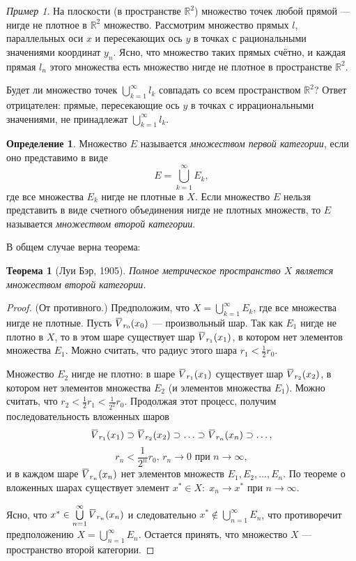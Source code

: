 \documentclass[12pt,a4paper,titlepage,oneside]{book}
\newcommand{\overbar}[1]{\mkern 1.5mu\overline{\mkern-1.5mu#1\mkern-1.5mu}\mkern 1.5mu}
\theoremstyle{definition}
\newtheorem*{definition}{Определение}
\theoremstyle{plain}
\newtheorem*{theorem}{Теорема}
\theoremstyle{break}
\theoremstyle{remark}
\theoremstyle{remark}
\newtheorem*{example}{Пример}
\theoremstyle{remark}
\theoremstyle{remark}
\theoremstyle{plain}
\theoremstyle{plain}
\begin{document}
\begin{example}
На плоскости (в пространстве $\mathbb{R}^2$) множество точек любой прямой --- нигде не плотное в $\mathbb{R}^2$ множество.
Рассмотрим множество прямых $l$, параллельных оси $x$ и пересекающих ось $y$ в точках с рациональными значениями координат $y_n$. Ясно, что множество таких прямых счётно, и каждая прямая $l_n$ этого множества есть множество нигде не плотное в пространстве $\mathbb{R}^2$.

Будет ли множество точек $\bigcup\limits_{k=1}^\infty l_k$ совпадать со всем пространством $\mathbb{R}^2$? Ответ отрицателен: прямые, пересекающие ось $y$ в точках с иррациональными значениями, не принадлежат $\bigcup\limits_{k=1}^\infty l_k$.
\end{example}

\begin{definition}
Множество $E$ называется \textit{множеством первой категории}, если оно представимо в виде 
$$E=\bigcup\limits_{k=1}^\infty E_k,$$ 
где все множества $E_k$ нигде не плотные в $X$. Если множество $E$ нельзя представить в виде счетного объединения нигде не плотных множеств, то $E$ называется \textit{множеством второй категории}.
\end{definition}

В общем случае верна теорема:

\begin{theorem}[Луи Бэр, 1905]
Полное метрическое пространство $X$ является множеством второй категории.
\end{theorem}

\begin{proof}
(От противного.) Предположим, что $X=\bigcup\limits_{k=1}^\infty E_k$, где все множества нигде не плотные. Пусть $\overbar{V}_{r_0}(x_0)$ --- произвольный шар. Так как $E_1$ нигде не плотно в $X$, то в этом шаре существует шар $\overbar{V}_{r_1}(x_1)$, в котором нет элементов множества $E_1$. Можно считать, что радиус этого шара $r_1 < \frac{1}{2}r_0$.

Множество $E_2$ нигде не плотно: в шаре $\overbar{V}_{r_1}(x_1)$ существует шар $\overbar{V}_{r_2}(x_2)$, в котором нет элементов множества $E_2$ (и элементов множества $E_1$). Можно считать, что $r_2 < \frac{1}{2}r_1 < \frac{1}{2^2}r_0$.
Продолжая этот процесс, получим последовательность вложенных шаров 
$$\overbar{V}_{r_1}(x_1) \supset \overbar{V}_{r_2}(x_2) \supset \ldots \supset \overbar{V}_{r_n}(x_n) \supset \ldots,$$
$$r_n < \frac{1}{2^n}r_0 \mbox{, } r_n \to 0 \mbox{ при } n \to \infty,$$
и в каждом шаре $\overbar{V}_{r_n}(x_n)$ нет элементов множеств $E_1, E_2, \ldots, E_n$.
По теореме о вложенных шарах существует элемент $x^* \in X: \; x_n \to x^*$ при $n \to \infty$.

Ясно, что $x^*\in \bigcup\limits_{n=1}^\infty \overbar{V}_{r_n}(x_n)$ и следовательно $x^*\notin \bigcup\limits_{n=1}^\infty E_n$, что противоречит предположению $X=\bigcup\limits_{n=1}^\infty E_n$. Остается принять, что множество $X$ --- пространство второй категории.
\end{proof}
\end{document}
